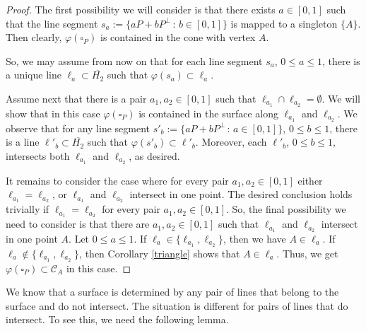 \documentclass[10pt]{amsart}
\theoremstyle{definition}
\theoremstyle{remark}
\numberwithin{subsection}{section}
\numberwithin{equation}{section}
\newcommand\cC{{\mathcal{C}}}
\newcommand\oH{{\overline{H_2}}}
\begin{document}
\begin{proof}
The first possibility we will consider is that there exists $a\in [0,1]$ such that the line segment $s_a := \{ aP + bP^\perp \, : \, b \in [0,1] \}$ is mapped to a singleton $\{ A \}$. Then clearly, $\varphi ({\square}_P)$ is contained in the cone with vertex $A$.

So, we may assume from now on that for each line segment $s_a$, $0 \le a \le 1$, there is a unique line $\ell_a \subset \oH$ such that $\varphi (s_a) \subset \ell_a$.

Assume next that there is a pair $a_1 , a_2 \in [0,1]$ such that $\ell_{a_1} \cap \ell_{a_2} =\emptyset$. We will show that in this case $\varphi ({\square}_P)$ is contained in the surface along $\ell_{a_1}$ and $\ell_{a_2}$. 
We observe that for any line segment $s'_b := \{ aP + bP^\perp \, : \, a \in [0,1] \}$, $0 \le b \le 1$, there is a line $\ell'_b \subset \oH$ such that $\varphi (s'_b) \subset \ell'_b$. Moreover, each $\ell'_b$, $0 \le b \le 1$, intersects both $\ell_{a_1}$ and $\ell_{a_2}$, as desired.

It remains to consider the case where for every pair $a_1 , a_2 \in [0,1]$ either $\ell_{a_1} = \ell_{a_2}$, or $\ell_{a_1}$ and $\ell_{a_2}$ intersect in one point. 
The desired conclusion holds trivially if $\ell_{a_1} = \ell_{a_2}$ for every pair $a_1 , a_2 \in [0,1]$. 
So, the final possibility we need to consider is that there are $a_1 , a_2 \in [0,1]$ such that  $\ell_{a_1}$ and $\ell_{a_2}$ intersect in one point $A$.
Let $0 \le a \le 1$. 
If $\ell_{a}\in\{\ell_{a_1}, \ell_{a_2}\}$, then we have $A\in \ell_a$. 
If $\ell_{a}\notin\{\ell_{a_1}, \ell_{a_2}\}$, then Corollary \ref{triangle} shows that $A\in \ell_a$. 
Thus, we get $\varphi ({\square}_P)\subset \cC_A$ in this case.
\end{proof}


We know that a surface is determined by any pair of lines that belong to the surface and do not intersect. The situation is different for pairs of lines that do intersect. 
To see this, we need the following lemma. 
\end{document}
